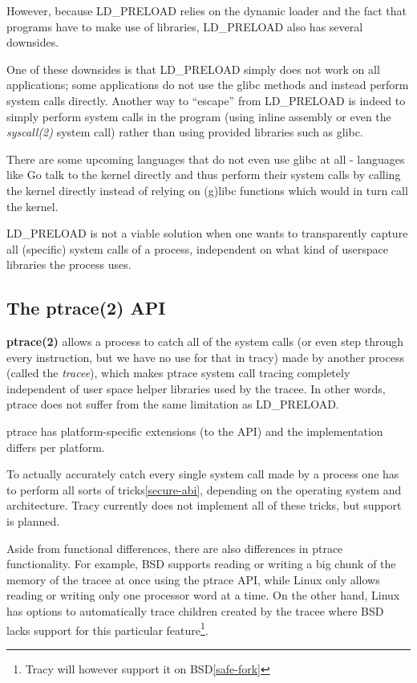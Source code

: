 \documentclass[a4paper, 10pt]{report}
\begin{document}
However, because LD\_PRELOAD relies on the dynamic loader and the fact that
programs have to make use of libraries, LD\_PRELOAD also has several downsides.

One of these downsides is that LD\_PRELOAD simply does not work on all
applications; some applications do not use the glibc methods and instead
perform system calls directly. Another way to ``escape'' from LD\_PRELOAD
is indeed to simply perform system calls in the program (using inline assembly
or even the \textit{syscall(2)} system call) rather than using
provided libraries such as glibc.

There are some upcoming languages that do not even use glibc at all - languages
like Go \cite{golang} talk to the kernel directly and thus perform their
system calls by calling the kernel directly instead of
relying on (g)libc functions which would in turn call the kernel.

LD\_PRELOAD is not a viable solution when one wants to transparently capture
all (specific) system calls of a process, independent on what kind of
userspace libraries the process uses.

\subsection{The ptrace(2) API}

\textbf{ptrace(2)} allows a process to catch all of the system calls (or even
step through every instruction, but we have no use for that in tracy)
made by another process (called the \textit{tracee}), which makes ptrace system
call tracing completely independent of user space helper libraries used by the
tracee. In other words, ptrace does not suffer from the same limitation as
LD\_PRELOAD.

ptrace has platform-specific extensions (to the API) and the
implementation differs per platform.

To actually accurately catch every single system call made by a process one has
to perform all sorts of tricks\ref{secure-abi}, depending on the operating
system and architecture. Tracy currently does not implement all of these
tricks, but support is planned.

Aside from functional differences, there are also differences in ptrace
functionality.
For example, BSD supports reading or writing a big chunk of the memory
of the tracee at once using the ptrace API, while Linux only allows
reading or writing only one processor word at a time.
On the other hand, Linux has options to automatically trace
children created by the tracee where BSD lacks support for
this particular feature\footnote{Tracy will however support it on
BSD\ref{safe-fork}}.
\end{document}
